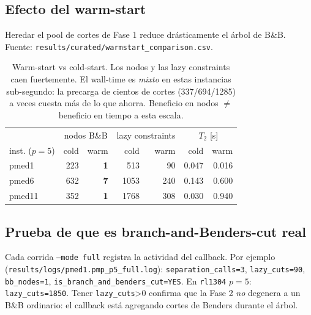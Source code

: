 \subsection{Efecto del warm-start}
Heredar el pool de cortes de Fase 1 reduce drásticamente el árbol de B\&B. Fuente:
\texttt{results/curated/warmstart\_comparison.csv}.

\begin{table}[h]\centering\small
\begin{tabular}{lrr rr rr}
\toprule
 & \multicolumn{2}{c}{nodos B\&B} & \multicolumn{2}{c}{lazy constraints} & \multicolumn{2}{c}{$T_2$ [s]} \\
inst. ($p=5$) & cold & warm & cold & warm & cold & warm \\
\midrule
pmed1  & 223 & \textbf{1} & 513  & 90  & 0.047 & 0.016 \\
pmed6  & 632 & \textbf{7} & 1053 & 240 & 0.143 & 0.600 \\
pmed11 & 352 & \textbf{1} & 1768 & 308 & 0.030 & 0.940 \\
\bottomrule
\end{tabular}
\caption{Warm-start vs cold-start. Los nodos y las lazy constraints caen fuertemente. El wall-time es
\emph{mixto} en estas instancias sub-segundo: la precarga de cientos de cortes (337/694/1285) a
veces cuesta más de lo que ahorra. Beneficio en nodos $\ne$ beneficio en tiempo a esta escala.}
\label{tab:warm}
\end{table}

\subsection{Prueba de que es branch-and-Benders-cut real}
Cada corrida \texttt{--mode full} registra la actividad del callback. Por ejemplo
(\texttt{results/logs/pmed1.pmp\_p5\_full.log}): \texttt{separation\_calls=3}, \texttt{lazy\_cuts=90},
\texttt{bb\_nodes=1}, \texttt{is\_branch\_and\_benders\_cut=YES}. En \texttt{rl1304} $p=5$:
\texttt{lazy\_cuts=1850}. Tener \texttt{lazy\_cuts}>0 confirma que la Fase 2 \emph{no} degenera a
un B\&B ordinario: el callback está agregando cortes de Benders durante el árbol.

